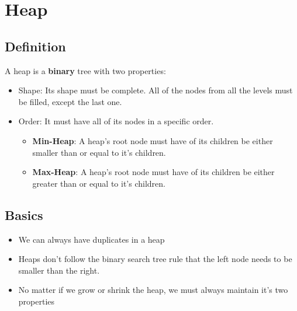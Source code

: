 \chapter{Heap}
\section{Definition}
	A heap is a \textbf{binary} tree with two properties:
	\begin{itemize}
		\item Shape: Its shape must be complete. All of the nodes from all the levels must be filled, except the last one.
		\item Order: It must have all of its nodes in a specific order.
		\begin{itemize}
			\item \textbf{Min-Heap}: A heap's root node must have of its children be either smaller than or equal to it's children.
			\item \textbf{Max-Heap}: A heap's root node must have of its children be either greater than or equal to it's children.
		\end{itemize}
	\end{itemize}
\section{Basics}
	\begin{itemize}
		\item We can always have duplicates in a heap
		\item Heaps don't follow the binary search tree rule that the left node needs to be smaller than the right.
		\item No matter if we grow or shrink the heap, we must always maintain it's two properties
	\end{itemize}
